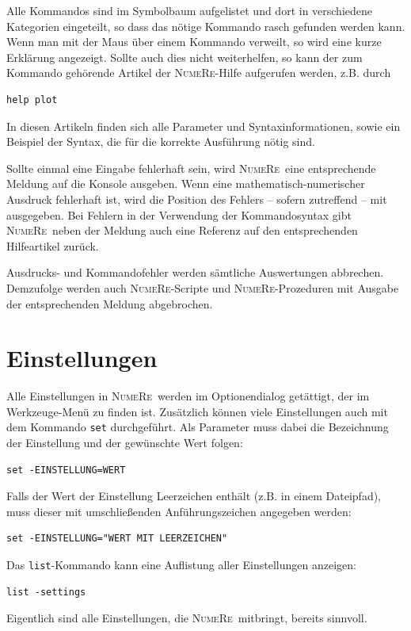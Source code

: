 \documentclass[DIV=14,headsepline,footsepline]{scrbook}
\newcommand{\NR}{\textsc{Nu\-me\-Re}}
\begin{document}
				Alle Kommandos sind im Symbolbaum aufgelistet und dort in verschiedene Kategorien eingeteilt, so dass das nötige Kommando rasch gefunden werden kann. Wenn man mit der Maus über einem Kommando verweilt, so wird eine kurze Erklärung angezeigt. Sollte auch dies nicht weiterhelfen, so kann der zum Kommando gehörende Artikel der \NR-Hilfe aufgerufen werden, z.B. durch
				\begin{lstlisting}
help plot
				\end{lstlisting}
				In diesen Artikeln finden sich alle Parameter und Syntaxinformationen, sowie ein Beispiel der Syntax, die für die korrekte Ausführung nötig sind.
				
				Sollte einmal eine Eingabe fehlerhaft sein, wird \NR\ eine entsprechende Meldung auf die Konsole ausgeben. Wenn eine mathematisch-numerischer Ausdruck fehlerhaft ist, wird die Position des Fehlers -- sofern zutreffend -- mit ausgegeben. Bei Fehlern in der Verwendung der Kommandosyntax gibt \NR\ neben der Meldung auch eine Referenz auf den entsprechenden Hilfeartikel zurück.
				
				Ausdrucks- und Kommandofehler werden sämtliche Auswertungen abbrechen. Demzufolge werden auch \NR-Scripte und \NR-Prozeduren mit Ausgabe der entsprechenden Meldung abgebrochen.
			\section{Einstellungen}
				Alle Einstellungen in \NR\ werden im Optionendialog getättigt, der im Werkzeuge-Menü zu finden ist. Zusätzlich können viele Einstellungen auch mit dem Kommando \verb+set+ durchgeführt. Als Parameter muss dabei die Bezeichnung der Einstellung und der gewünschte Wert folgen:
				\begin{lstlisting}
set -EINSTELLUNG=WERT
				\end{lstlisting}
				Falls der Wert der Einstellung Leerzeichen enthält (z.B. in einem Dateipfad), muss dieser mit umschließenden Anführungszeichen angegeben werden:
				\begin{lstlisting}
set -EINSTELLUNG="WERT MIT LEERZEICHEN"
				\end{lstlisting}
				Das \verb+list+-Kommando kann eine Auflistung aller Einstellungen anzeigen:
				\begin{lstlisting}
list -settings
				\end{lstlisting}
				Eigentlich sind alle Einstellungen, die \NR\ mitbringt, bereits sinnvoll.
				
\end{document}
